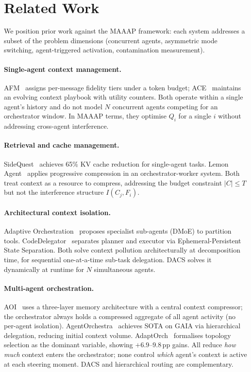 \documentclass{article}
\begin{document}
\section{Related Work}
\label{sec:related}

We position prior work against the MAAAP framework: each system addresses
a subset of the problem dimensions (concurrent agents, asymmetric mode
switching, agent-triggered activation, contamination measurement).

\paragraph{Single-agent context management.}
AFM~\citep{afm2024} assigns per-message fidelity tiers under a token
budget; ACE~\citep{ace2026} maintains an evolving context playbook with
utility counters.
Both operate within a single agent's history and do not model $N$
concurrent agents competing for an orchestrator window.
In MAAAP terms, they optimise $Q_i$ for a single $i$ without addressing
cross-agent interference.

\paragraph{Retrieval and cache management.}
SideQuest~\citep{sidequest2025} achieves 65\% KV cache reduction for
single-agent tasks.
Lemon Agent~\citep{lemon2025} applies progressive compression in an
orchestrator-worker system.
Both treat context as a resource to compress, addressing the budget
constraint $|C| \leq T$ but not the interference structure
$I(C_j, F_i)$.

\paragraph{Architectural context isolation.}
Adaptive Orchestration~\citep{adaptorch2025} proposes specialist
sub-agents (DMoE) to partition tools.
CodeDelegator~\citep{codedelegator2025} separates planner and executor
via Ephemeral-Persistent State Separation.
Both solve context pollution architecturally at decomposition time,
for sequential one-at-a-time sub-task delegation.
DACS solves it dynamically at runtime for $N$ simultaneous agents.

\paragraph{Multi-agent orchestration.}
AOI~\citep{aoi2024} uses a three-layer memory architecture with a
central context compressor; the orchestrator always holds a compressed
aggregate of all agent activity (no per-agent isolation).
AgentOrchestra~\citep{agentorchestra2025} achieves SOTA on GAIA via
hierarchical delegation, reducing initial context volume.
AdaptOrch~\citep{adaptorch2025b} formalises topology selection as the
dominant variable, showing $+6.9$--$9.8$\,pp gains.
All reduce \emph{how much} context enters the orchestrator;
none control \emph{which} agent's context is active at each steering
moment.
DACS and hierarchical routing are complementary.
\end{document}
